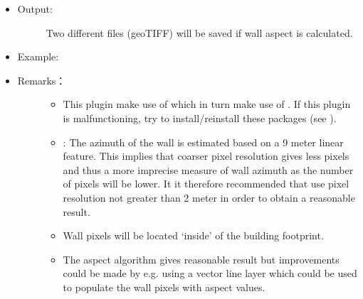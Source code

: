 \documentclass[letterpaper,10pt,english]{sphinxmanual}
\begin{document}
\begin{itemize}
\begin{description}
\end{description}

\item {} \begin{description}
\item[{Output:}] \leavevmode
Two different files (geoTIFF) will be saved if wall aspect is calculated.

\end{description}

\item {} \begin{description}
\item[{Example:}] \leavevmode
\begin{figure}[htbp]
\centering
\capstart

\noindent{}
\caption{}\label{\detokenize{pre-processor/Urban Geometry Wall Height and Aspect:id2}}\end{figure}

\end{description}

\item {} \begin{description}
\item[{Remarks：}] \leavevmode\begin{itemize}
\item {} 
This plugin make use of  which in turn make use of . If this plugin is malfunctioning, try to install/reinstall these packages (see ).

\item {} 
: The azimuth of the wall is estimated based on a 9 meter linear feature. This implies that coarser pixel resolution gives less pixels and thus a more imprecise measure of wall azimuth as the number of pixels will be lower. It it therefore recommended that use pixel resolution not greater than 2 meter in order to obtain a reasonable result.

\item {} 
Wall pixels will be located ‘inside’ of the building footprint.

\item {} 
The aspect algorithm gives reasonable result but improvements could be made by e.g. using a vector line layer which could be used to populate the wall pixels with aspect values.


\end{itemize}
\end{description}
\end{itemize}
\end{document}
